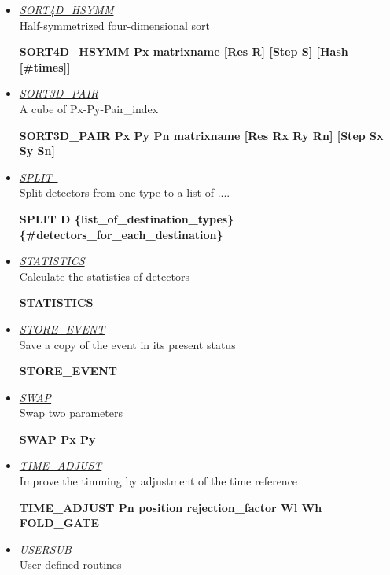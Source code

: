 \begin{itemize}
 \item	{\it\underline{SORT4D\_HSYMM}} \\
	{\sc Half-symmetrized four-dimensional sort	}

	\smallskip
	{\bf SORT4D\_HSYMM Px matrixname [Res R] [Step S] [Hash [\#times]]} \\

 \item	{\it\underline{SORT3D\_PAIR}} \\
	{\sc A cube of Px-Py-Pair\_index}

	\smallskip
	{\bf SORT3D\_PAIR Px Py Pn matrixname [Res Rx Ry Rn] [Step Sx Sy Sn]}\\ 

 \item	{\it\underline{SPLIT~}}\footnotemark[1] \\
	{\sc Split detectors from one type to a list of ....}

	\smallskip
	{\bf SPLIT D \{list\_of\_destination\_types\} 
	\{\#detectors\_for\_each\_destination\}} \\

 \item	{\it\underline{STATISTICS}} \\
	{\sc Calculate the statistics of detectors}

	\smallskip
	{\bf STATISTICS} \\

 \item	{\it\underline{STORE\_EVENT}} \\
	{\sc Save a copy of the event in its present status}

	\smallskip
	{\bf STORE\_EVENT} \\

 \item	{\it\underline{SWAP}} \\
	{\sc Swap two parameters}

	\smallskip
	{\bf SWAP Px Py} \\

 \item	{\it\underline{TIME\_ADJUST}} \\
	{\sc Improve the timming by adjustment of the time reference} 

	\smallskip
	{\bf TIME\_ADJUST Pn position rejection\_factor Wl Wh FOLD\_GATE} \\

 \item	{\it\underline{USERSUB}} \\
	{\sc User defined routines}


\end{itemize}
